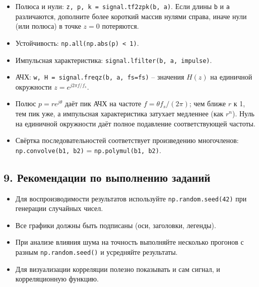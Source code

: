 \documentclass[12pt,a4paper,openany]{book}
\providecommand{\tightlist}{\setlength{\itemsep}{0pt}\setlength{\parskip}{0pt}}
\begin{document}
\begin{itemize}
\tightlist
\item
  Полюса и нули: \texttt{z,\allowbreak{}\ p,\allowbreak{}\ k\ =\allowbreak{}\ signal.\allowbreak{}tf2zpk(\allowbreak{}b,\allowbreak{}\ a)}. Если длины \texttt{b} и \texttt{a} различаются, дополните более короткий массив нулями справа, иначе нули (или полюса) в точке \(z = 0\) потеряются.
\item
  Устойчивость: \texttt{np.\allowbreak{}all(\allowbreak{}np.\allowbreak{}abs(\allowbreak{}p)\ \textless{}\ 1)}.
\item
  Импульсная характеристика: \texttt{signal.\allowbreak{}lfilter(\allowbreak{}b,\allowbreak{}\ a,\allowbreak{}\ impulse)}.
\item
  АЧХ: \texttt{w,\allowbreak{}\ H\ =\allowbreak{}\ signal.\allowbreak{}freqz(\allowbreak{}b,\allowbreak{}\ a,\allowbreak{}\ fs=\allowbreak{}fs)} -- значения \(H(z)\) на единичной окружности \(z = e^{j2\pi f/f_s}\).
\item
  Полюс \(p = r e^{j\theta}\) даёт пик АЧХ на частоте \(f = \theta f_s / (2\pi)\); чем ближе \(r\) к 1, тем пик уже, а импульсная характеристика затухает медленнее (как \(r^n\)). Нуль на единичной окружности даёт полное подавление соответствующей частоты.
\item
  Свёртка последовательностей соответствует произведению многочленов: \texttt{np.\allowbreak{}convolve(\allowbreak{}b1,\allowbreak{}\ b2)} = \texttt{np.\allowbreak{}polymul(\allowbreak{}b1,\allowbreak{}\ b2)}.
\end{itemize}

\subsection*{9. Рекомендации по выполнению заданий}

\begin{itemize}
\tightlist
\item
  Для воспроизводимости результатов используйте \texttt{np.\allowbreak{}random.\allowbreak{}seed(\allowbreak{}42)} при генерации случайных чисел.
\item
  Все графики должны быть подписаны (оси, заголовки, легенды).
\item
  При анализе влияния шума на точность выполняйте несколько прогонов с разным \texttt{np.\allowbreak{}random.\allowbreak{}seed(\allowbreak{})} и усредняйте результаты.
\item
  Для визуализации корреляции полезно показывать и сам сигнал, и корреляционную функцию.
\end{itemize}
\end{document}
